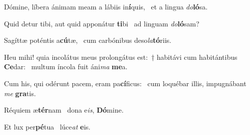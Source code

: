 \item Dómine, líbera ánimam meam a lábiis in\textbf{í}quis,~\psstar{} et a lingua \textit{do}\textbf{ló}sa.

\item Quid detur tibi, aut quid apponátur \textbf{ti}bi~\psstar{} ad linguam \textit{do}\textbf{ló}sam?

\item Sagíttæ poténtis a\textbf{cú}tæ,~\psstar{} cum carbónibus deso\textit{la}\textbf{tó}riis.

\item Heu mihi! quia incolátus meus prolongátus est:~† habitávi cum habitántibus \textbf{Ce}dar:~\psstar{} multum íncola fuit áni\textit{ma} \textbf{me}a.

\item Cum his, qui odérunt pacem, eram pa\textbf{cí}ficus:~\psstar{} cum loquébar illis, impugnábant \textit{me} \textbf{gra}tis.

\item Réquiem æ\textbf{tér}nam~\psstar{} dona e\textit{is}, \textbf{Dó}mine.

\item Et lux per\textbf{pé}tua~\psstar{} lúce\textit{at} \textbf{e}is.